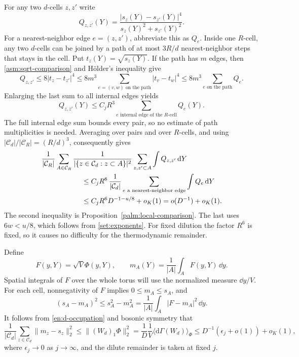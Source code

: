 For any two $d$-cells $z,z'$ write
\[
 Q_{z,z'}(Y)=
   \frac{|s_z(Y)-s_{z'}(Y)|^4}{s_z(Y)^2+s_{z'}(Y)^2}.
\]
For a nearest-neighbor edge $e=(z,z')$, abbreviate this as $Q_e$.
Inside one $R$-cell, any two $d$-cells can be joined by a path of at most
$3R/d$ nearest-neighbor steps that stays in the cell. Put
$t_z(Y)=\sqrt{s_z(Y)}$. If the path has $m$ edges, then
\eqref{asm:sqrt-comparison} and H\"older's inequality give
\[
 Q_{z,z'}\le8|t_z-t_{z'}|^4
       \le8m^3\sum_{e=(v,w)\text{ on the path}}|t_v-t_w|^4
       \le8m^3\sum_{e\text{ on the path}}Q_e.
\]
Enlarging the last sum to all internal edges yields
\begin{equation}\label{asm:path-fourth}
 Q_{z,z'}(Y)\le C_jR^3
       \sum_{e\text{ internal edge of the }R\text{-cell}}Q_e(Y).
\end{equation}
The full internal edge sum bounds every pair, so no estimate of path
multiplicities is needed. Averaging over pairs and over $R$-cells, and using
$|\mathcal C_d|/|\mathcal C_R|=(R/d)^3$, consequently gives
\begin{align}
 &\frac1{|\mathcal C_R|}\sum_{A\in\mathcal C_R}
   \frac1{|\{z\in\mathcal C_d:z\subset A\}|^2}
    \sum_{z,z'\subset A}\int Q_{z,z'}\,\dd Y
 \notag\\
 &\hspace{20mm}\le C_jR^6\,
       \frac1{|\mathcal C_d|}\sum_{e\text{ a nearest-neighbor edge}}
             \int Q_e\,\dd Y
 \notag\\
 &\hspace{20mm}\le C_j R^6 D^{-1-u/8}+o_K(1)
 =o(D^{-1})+o_K(1).
 \label{asm:all-local-pairs}
\end{align}
The second inequality is Proposition~\ref{palm:local-comparison}.
The last uses $6w<u/8$, which follows from \eqref{set:exponents}.
For fixed dilution the factor $R^6$ is fixed, so it causes no difficulty
for the thermodynamic remainder.

Define
\begin{equation}\label{asm:field-means}
 F(y,Y)=\sqrt V\Phi(y,Y),\qquad
 m_A(Y)=\frac1{|A|}\int_A F(y,Y)\,\dd y.
\end{equation}
Spatial integrals of $F$ over the whole torus will use the normalized
measure $\dd y/V$. For each cell, nonnegativity of $F$ implies
$0\le m_A\le s_A$, and
\[
 (s_A-m_A)^2\le s_A^2-m_A^2
       =\frac1{|A|}\int_A|F-m_A|^2\,\dd y.
\]
It follows from \eqref{en:d-occupation} and bosonic symmetry that
\begin{equation}\label{asm:micro-mean-rms}
 \frac1{|\mathcal C_d|}\sum_{z\in\mathcal C_d}
       \|m_z-s_z\|_2^2
 \le\|(W_d)_1\Phi\|_2^2
 =\frac1D\frac1V\langle\mathrm d\Gamma(W_d)\rangle_\Phi
 \le D^{-1}(\epsilon_j+o(1))+o_K(1),
\end{equation}
where $\epsilon_j\to0$ as $j\to\infty$, and the dilute remainder is taken
at fixed $j$.

